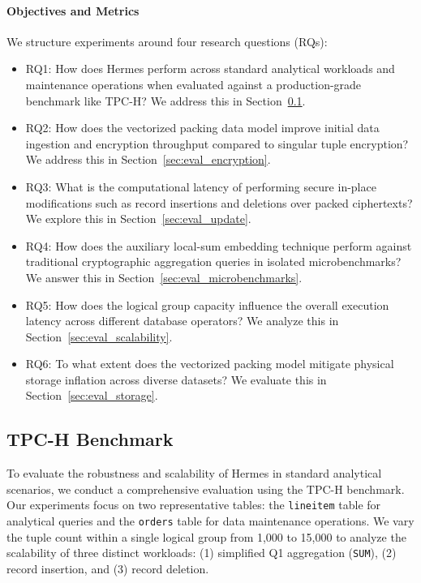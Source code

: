 \documentclass[sigconf,nonacm]{acmart}
\begin{document}
\paragraph{Objectives and Metrics}
We structure experiments around four research questions (RQs):
\begin{itemize}
    \item RQ1: How does Hermes perform across standard analytical workloads and maintenance operations when evaluated against a production-grade benchmark like TPC-H? We address this in Section~\ref{sec:eval_tpch}.
    \item RQ2: How does the vectorized packing data model improve initial data ingestion and encryption throughput compared to singular tuple encryption? We address this in Section~\ref{sec:eval_encryption}.
    \item RQ3: What is the computational latency of performing secure in-place modifications such as record insertions and deletions over packed ciphertexts? We explore this in Section~\ref{sec:eval_update}.
    \item RQ4: How does the auxiliary local-sum embedding technique perform against traditional cryptographic aggregation queries in isolated microbenchmarks? We answer this in Section~\ref{sec:eval_microbenchmarks}.
    \item RQ5: How does the logical group capacity influence the overall execution latency across different database operators? We analyze this in Section~\ref{sec:eval_scalability}.
    \item RQ6: To what extent does the vectorized packing model mitigate physical storage inflation across diverse datasets? We evaluate this in Section~\ref{sec:eval_storage}.
\end{itemize}

\subsection{TPC-H Benchmark}
\label{sec:eval_tpch}

To evaluate the robustness and scalability of Hermes in standard analytical scenarios, we conduct a comprehensive evaluation using the TPC-H benchmark. Our experiments focus on two representative tables: the \texttt{lineitem} table for analytical queries and the \texttt{orders} table for data maintenance operations. We vary the tuple count within a single logical group from 1,000 to 15,000 to analyze the scalability of three distinct workloads: (1) simplified Q1 aggregation (\texttt{SUM}), (2) record insertion, and (3) record deletion.
\end{document}
